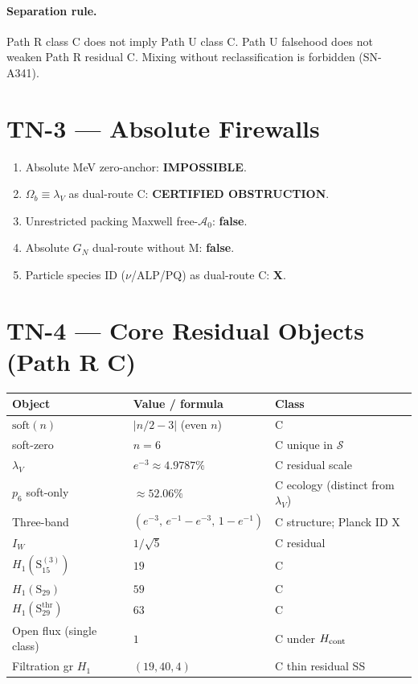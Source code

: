 \documentclass[11pt,a4paper]{article}
\begin{document}
\paragraph{Separation rule.}
Path R class C does not imply Path U class C.
Path U falsehood does not weaken Path R residual C.
Mixing without reclassification is forbidden (SN-A341).

\section{TN-3 --- Absolute Firewalls}
\begin{enumerate}[label=(\roman*)]
\item Absolute MeV zero-anchor: \textbf{IMPOSSIBLE}.
\item $\Omega_b\equiv\lambda_V$ as dual-route C: \textbf{CERTIFIED OBSTRUCTION}.
\item Unrestricted packing Maxwell free-$\mathcal{A}_0$: \textbf{false}.
\item Absolute $G_N$ dual-route without M: \textbf{false}.
\item Particle species ID ($\nu$/ALP/PQ) as dual-route C: \textbf{X}.
\end{enumerate}

\section{TN-4 --- Core Residual Objects (Path R C)}
\begin{center}
\begin{tabular}{@{}llp{5.5cm}@{}}
\toprule
Object & Value / formula & Class \\
\midrule
$\mathrm{soft}(n)$ & $|n/2-3|$ (even $n$) & C \\
soft-zero & $n=6$ & C unique in $\mathcal{S}$ \\
$\lambda_V$ & $e^{-3}\approx 4.9787\%$ & C residual scale \\
$p_6$ soft-only & $\approx 52.06\%$ & C ecology (distinct from $\lambda_V$) \\
Three-band & $(e^{-3},\,e^{-1}-e^{-3},\,1-e^{-1})$ & C structure; Planck ID X \\
$I_W$ & $1/\sqrt{5}$ & C residual \\
$H_1(\mathrm{S}_{15}^{(3)})$ & $19$ & C \\
$H_1(\mathrm{S}_{29})$ & $59$ & C \\
$H_1(\mathrm{S}_{29}^{\mathrm{thr}})$ & $63$ & C \\
Open flux (single class) & $1$ & C under $H_{\rm cont}$ \\
Filtration gr $H_1$ & $(19,40,4)$ & C thin residual SS \\
\bottomrule
\end{tabular}
\end{center}
\end{document}
